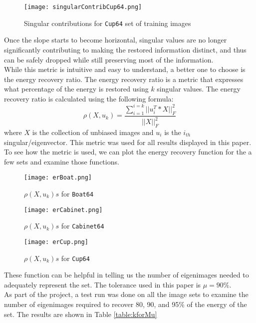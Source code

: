 \documentclass[10pt,twocolumn,letterpaper]{article}
\begin{document}
\begin{figure}
\texttt{[image: singularContribCup64.png]}
\caption{Singular contributions for \texttt{Cup64} set of training images}
\label{fig:singularContribCup64}
\end{figure}
Once the slope starts to become horizontal, singular values are no longer significantly contributing to making the restored information distinct, and thus can be safely dropped while still preserving most of the information.\\
While this metric is intuitive and easy to understand, a better one to choose is the energy recovery ratio. The energy recovery ratio is a metric that expresses what percentage of the energy is restored using $k$ singular values. The energy recovery ratio is calculated using the following formula:
\begin{equation}
\rho(X,u_{k}) = \frac{\sum_{i=1}^{i=k} ||u_{i}^{T}*X||_{F}^{2}}{||X||_{F}^2}
\end{equation}
where $X$ is the collection of unbiased images and $u_i$ is the $i_{th}$ singular/eigenvector. This metric was used for all results displayed in this paper.
To see how the metric is used, we can plot the energy recovery function for the a few sets and examine those functions.
\begin{figure}
\texttt{[image: erBoat.png]}
\caption{$\rho(X,u_{k})s$ for \texttt{Boat64}}
\label{fig:erBoat}
\end{figure}
\begin{figure}
\texttt{[image: erCabinet.png]}
\caption{$\rho(X,u_{k})s$ for \texttt{Cabinet64}}
\label{fig:erCabinet}
\end{figure}
\begin{figure}
\texttt{[image: erCup.png]}
\caption{$\rho(X,u_{k})s$ for \texttt{Cup64}}
\label{fig:erCup}
\end{figure}
These function can be helpful in telling us the number of eigenimages needed to adequately represent the set. The tolerance used in this paper is $\mu = 90\%$.\\
As part of the project, a test run was done on all the image sets to examine the number of eigenimages required to recover 80, 90, and 95\% of the energy of the set. The results are shown in Table \ref{table:kforMu}
\end{document}
